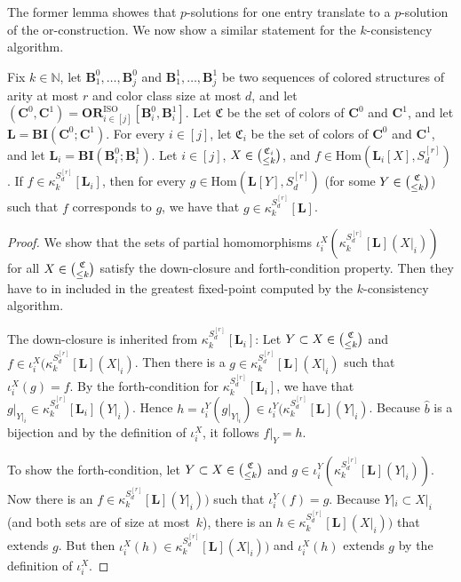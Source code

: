\documentclass[a4paper,english, thm-restate]{lipics-v2021}
\newcommand{\nat}{\mathbb{N}}
\newcommand{\StructB}{\mathbf{B}}
\newcommand{\StructC}{\mathbf{C}}
\newcommand{\StructL}{\mathbf{L}}
\newcommand{\kcol}[3]{\kappa_{#1}^{#2}[#3]}
\newcommand{\restrict}[2]{#1|_{#2}}
\newcommand{\Hom}[2]{\mathrm{Hom}(#1,#2)}
\newcommand{\bcisosys}[2]{\mathbf{BI}(#1;#2)}
\newcommand{\colors}{\mathfrak{C}}
\newcommand{\CosetGrpTmplt}[2]{#1^{[#2]}}
\newcommand{\Sym}[1]{S_{#1}}
\newcommand{\SymStruct}[2]{\CosetGrpTmplt{\Sym{#1}}{#2}}
\newcommand{\ORISO}[2]{\mathbf{OR}^{\text{ISO}}_{#1}[#2]}
\begin{document}
	\noindent The former lemma showes that $p$-solutions for one entry translate to a $p$-solution of the or-construction.
	We now show a similar statement for the $k$-consistency algorithm.
	\begin{lemma}
		\label{lem:or-construction-k-consistency}
		Fix $k \in \nat$, let $\StructB_1^0, \dots, \StructB_j^0$ and $\StructB_1^1,\dots, \StructB_j^1$
		be two sequences of colored structures of arity at most $r$ and color class size at most $d$,
		and let $(\StructC^0, \StructC^1) = \ORISO{i\in [j]} {\StructB_i^0,\StructB_i^1}$.
		Let $\colors$ be the set of colors of $\StructC^0$ and $\StructC^1$,
		and let $\StructL = \bcisosys{\StructC^0}{\StructC^1}$.
		For every $i \in [j]$,
		let $\colors_i$ be the set of colors of $\StructC^0$ and $\StructC^1$,
		and let $\StructL_i = \bcisosys{\StructB_i^0}{\StructB_i^1}$.
		Let $i \in [j]$,  $X \in \tbinom{\colors_i}{\leq k}$, and $f \in \Hom{\StructL_i[X]}{\SymStruct{d}{r}}$.
		If $f \in \kcol{k}{\SymStruct{d}{r}}{\StructL_i}$,
		then for every  $g \in \Hom{\StructL[Y]}{\SymStruct{d}{r}}$ (for some $Y \in \tbinom{\colors}{\leq k}$)
		such that $f$ corresponds to $g$,	
we have that $g \in \kcol{k}{\SymStruct{d}{r}}{\StructL}$.
	\end{lemma}
	\begin{proof}
		We show that the sets of partial homomorphisms
		$\iota_i^X(\kcol{k}{\SymStruct{d}{r}}{\StructL}(\restrict{X}{i}))$ for all $X \in \tbinom{\colors}{\leq k}$
		satisfy the down-closure and forth-condition property.
		Then they have to in included in the greatest fixed-point computed
		by the $k$-consistency algorithm.
		
		The down-closure is inherited from $\kcol{k}{\SymStruct{d}{r}}{\StructL_i}$:
		Let  $Y \subset X \in \tbinom{\colors}{\leq k}$
		and $f \in \iota_i^X(\kcol{k}{\SymStruct{d}{r}}{\StructL}(\restrict{X}{i})$.
		Then there is a $g \in \kcol{k}{\SymStruct{d}{r}}{\StructL}(\restrict{X}{i})$
		such that $\iota_i^X(g) = f$.
		By the forth-condition for $\kcol{k}{\SymStruct{d}{r}}{\StructL_i}$,
		we have that $\restrict{g}{\restrict{Y}{i}} \in 
		\kcol{k}{\SymStruct{d}{r}}{\StructL_i}(\restrict{Y}{i})$.
		Hence $h=\iota_i^Y(\restrict{g}{\restrict{Y}{i}}) \in
		\iota_i^Y(\kcol{k}{\SymStruct{d}{r}}{\StructL}(\restrict{Y}{i})$.
		Because $\hat{b}$ is a bijection
		and by the definition of $\iota_i^X$,
		it follows $\restrict{f}{Y} = h$.
		
		To show the forth-condition,
		let  $Y \subset X \in \tbinom{\colors}{\leq k}$
		and $g \in \iota_i^Y(\kcol{k}{\SymStruct{d}{r}}{\StructL}(\restrict{Y}{i}))$.
		Now there is an $f \in\kcol{k}{\SymStruct{d}{r}}{\StructL}(\restrict{Y}{i}))$
		such that $\iota_i^Y(f) = g$.
		Because $\restrict{Y}{i} \subset \restrict{X}{i}$ (and both sets are of size at most~$k$),
		there is an $h \in \kcol{k}{\SymStruct{d}{r}}{\StructL}(\restrict{X}{i}))$
		that extends $g$.
		But then $\iota_i^X(h) \in \kcol{k}{\SymStruct{d}{r}}{\StructL}(\restrict{X}{i}))$
		and $\iota_i^X(h)$ extends $g$
		by the definition of $\iota_i^X$.
	\end{proof}
	
\end{document}

